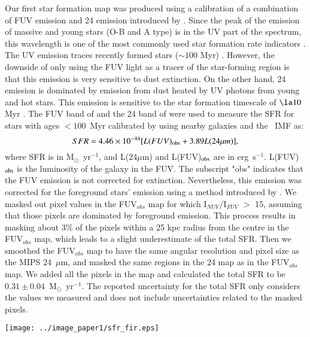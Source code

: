 Our first star formation map was produced using a calibration of a combination of FUV emission and 24 \um emission introduced by \citet{Hao11}. Since the peak of the emission of massive and young stars (O-B and A type) is in the UV part of the spectrum, this wavelength is one of the most commonly used star formation rate indicators \citep[e.g.][]{Kennicutt89}. The UV emission traces recently formed stars ($\sim 100$ Myr) \citep[e.g.][]{Kennicutt98a, Calzetti05}. However, the downside of only using the FUV light as a tracer of the star-forming region is that this emission is very sensitive to dust extinction. On the other hand, 24 \um emission is dominated by emission from dust heated by UV photons from young and hot stars. This emission is sensitive to the star formation timescale of $\la10$ Myr \citep{Calzetti07}. The FUV band of \Galex and the 24 \um band of \Spitzer were used to measure the SFR for stars with ages $<100$~Myr calibrated by \citet{Hao11}  using nearby galaxies and the~\citet{Kroupa03} IMF as:
\begin{equation}
\label{equ: fuvplus24}
SFR =4.46\times10^{-44}[L(FUV)_{\rm obs}+3.89L(24\mu m)],
\end{equation}
\noindent where SFR is in M$_{\odot}$~yr$^{-1}$, and L(24$\mu$m) and L(FUV)$_{\rm obs}$ are in erg~s$^{-1}$. L(FUV)$_{\rm obs}$ is the luminosity of the galaxy in the FUV. The subscript "obs" indicates that the FUV emission is not corrected for extinction. Nevertheless, this emission was corrected for the foreground stars' emission using a method introduced by \citet{Leroy08}. We masked out pixel values in the FUV$_{obs}$ map for which I$_{NUV}$/I$_{FUV}$ $>$ 15, assuming that those pixels are dominated by foreground emission. This process results in masking about 3\% of the pixels within a 25 kpc radius from the centre in the FUV$_{obs}$ map, which leads to a slight underestimate of the total SFR. 
Then we smoothed the FUV$_{obs}$  map to have the same angular resolution and pixel size as the MIPS 24~$\mu$m, and masked the same regions in the 24 \um map as in the FUV$_{obs}$  map. We added all the pixels in the map and calculated the total SFR to be $0.31\pm 0.04$~M$_{\odot}$~yr$^{-1}$. The reported uncertainty for the total SFR only considers the values we measured and does not include uncertainties related to the masked pixels.


\begin{figure*}
    \centering
       \texttt{[image: ../image\_paper1/sfr\_fir.eps]}
    \caption {SFR map calculated from total infrared emission (see Section~\ref{sec:sfr_fir}). The SFR map here has an angular resolution of 18\arcsec and pixel size of 9.85\arcsec, the same as the MIPS 70 $\mu$m map.}
    \label{fig:sfrs}
\end{figure*}

